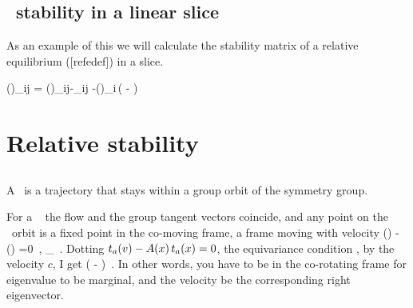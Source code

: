 {    \ifarticle
    \else

\subsection{\Reqva\ stability in a linear slice}

As an example of this we will calculate the stability matrix of a relative equilibrium ([refedef]) in a slice.


\beq
{\MvarRed}(\sspRed)_{ij} = \Mvar(\sspRed)_{ij}-\velRel \cdot \Lg_{ij}
     -\groupTan(\sspRed)_i\,\left(
     - \velRel {}
              \right)



\section{Relative stability}
\label{sect:relStab}


\subsection{\Reqva}

A \reqv\ is a trajectory that stays
within a group orbit of the symmetry group.

For a \reqv\ \REQV{}{} the flow and the group tangent vectors coincide, and
any point on the \reqv\ orbit is a fixed point in the co-moving frame,
a frame moving with velocity
\beq
\vel(\ssp) - \velRel \cdot \groupTan(\ssp) =0
    \,,\qquad
\ssp \in \pS_{\REQV{}{}}
\,.
Dotting
$
t_a(v)  - A(x) \, t_a(x) =0
$,
the
equivariance condition , by the velocity $c$,
I get
\beq
( \Mvar -  \velRel \cdot \Lg) 
\,.
In other words, you have to be in the co-rotating
frame for eigenvalue to be marginal, and the velocity
be the corresponding right eigenvector.

}
